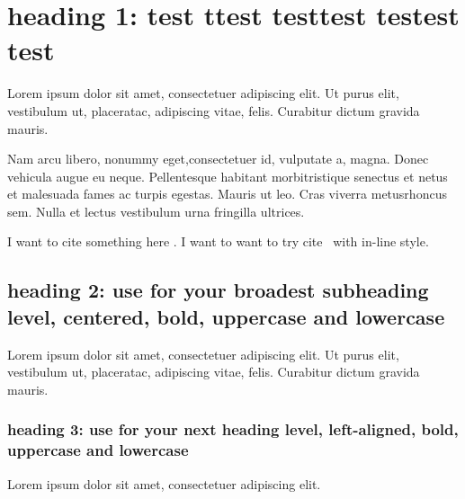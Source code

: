
\section{heading 1: test ttest testtest testest test}

Lorem ipsum dolor sit amet, consectetuer adipiscing elit.  Ut purus elit, vestibulum ut, placeratac,  adipiscing vitae,  felis.   Curabitur dictum gravida mauris.  

Nam arcu libero,  nonummy eget,consectetuer id, vulputate a, magna. Donec vehicula augue eu neque. Pellentesque habitant morbitristique senectus et netus et malesuada fames ac turpis egestas. Mauris ut leo. Cras viverra metusrhoncus sem.  Nulla et lectus vestibulum urna fringilla ultrices. 

I want to cite something here \parencite{zuo2019standing}. I want to want to try cite~\textcite{zuo2019standing} with in-line style.

\subsection{heading 2: use for your broadest subheading level, centered, bold, uppercase and lowercase}

Lorem ipsum dolor sit amet, consectetuer adipiscing elit.  Ut purus elit, vestibulum ut, placeratac,  adipiscing vitae,  felis.   Curabitur dictum gravida mauris. 

\subsubsection{heading 3: use for your next heading level, left-aligned, bold, uppercase and lowercase}

Lorem ipsum dolor sit amet, consectetuer adipiscing elit. 
